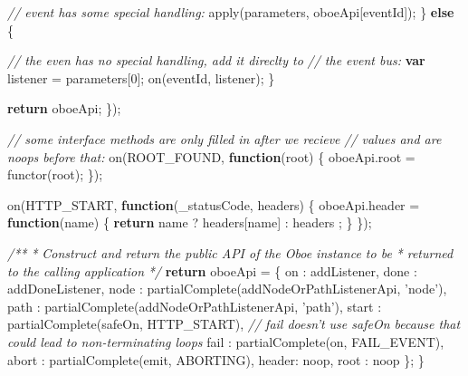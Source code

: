 \documentclass[12pt, ]{article}
\newenvironment{Shaded}{}{}
\newcommand{\KeywordTok}[1]{\textcolor[rgb]{0.00,0.44,0.13}{\textbf{{#1}}}}
\newcommand{\DataTypeTok}[1]{\textcolor[rgb]{0.56,0.13,0.00}{{#1}}}
\newcommand{\DecValTok}[1]{\textcolor[rgb]{0.25,0.63,0.44}{{#1}}}
\newcommand{\StringTok}[1]{\textcolor[rgb]{0.25,0.44,0.63}{{#1}}}
\newcommand{\CommentTok}[1]{\textcolor[rgb]{0.38,0.63,0.69}{\textit{{#1}}}}
\newcommand{\OtherTok}[1]{\textcolor[rgb]{0.00,0.44,0.13}{{#1}}}
\newcommand{\FunctionTok}[1]{\textcolor[rgb]{0.02,0.16,0.49}{{#1}}}
\newcommand{\NormalTok}[1]{{#1}}
\begin{document}
\begin{Shaded}
\begin{Highlighting}[]
         \CommentTok{// event has some special handling:}
         \FunctionTok{apply}\NormalTok{(parameters, oboeApi[eventId]);}
      \NormalTok{\} }\KeywordTok{else} \NormalTok{\{}
      
         \CommentTok{// the even has no special handling, add it direclty to}
         \CommentTok{// the event bus:         }
         \KeywordTok{var} \NormalTok{listener = parameters[}\DecValTok{0}\NormalTok{]; }
         \FunctionTok{on}\NormalTok{(eventId, listener);}
      \NormalTok{\}}
      
      \KeywordTok{return} \NormalTok{oboeApi;}
   \NormalTok{\});   }
   
   \CommentTok{// some interface methods are only filled in after we recieve}
   \CommentTok{// values and are noops before that:          }
   \FunctionTok{on}\NormalTok{(ROOT_FOUND, }\KeywordTok{function}\NormalTok{(root) \{}
      \OtherTok{oboeApi}\NormalTok{.}\FunctionTok{root} \NormalTok{= }\FunctionTok{functor}\NormalTok{(root);   }
   \NormalTok{\});}
   
   \FunctionTok{on}\NormalTok{(HTTP_START, }\KeywordTok{function}\NormalTok{(_statusCode, headers) \{}
      \OtherTok{oboeApi}\NormalTok{.}\FunctionTok{header} \NormalTok{= }
         \KeywordTok{function}\NormalTok{(name) \{}
            \KeywordTok{return} \NormalTok{name ? headers[name] }
                        \NormalTok{: headers}
                        \NormalTok{;}
         \NormalTok{\}}
   \NormalTok{\});}
      
   \CommentTok{/**}
\CommentTok{    * Construct and return the public API of the Oboe instance to be }
\CommentTok{    * returned to the calling application}
\CommentTok{    */}       
   \KeywordTok{return} \NormalTok{oboeApi = \{}
      \DataTypeTok{on    }\NormalTok{:  addListener,   }
      \DataTypeTok{done  }\NormalTok{:  addDoneListener,       }
      \DataTypeTok{node  }\NormalTok{:  }\FunctionTok{partialComplete}\NormalTok{(addNodeOrPathListenerApi, }\StringTok{'node'}\NormalTok{),}
      \DataTypeTok{path  }\NormalTok{:  }\FunctionTok{partialComplete}\NormalTok{(addNodeOrPathListenerApi, }\StringTok{'path'}\NormalTok{),      }
      \DataTypeTok{start }\NormalTok{:  }\FunctionTok{partialComplete}\NormalTok{(safeOn, HTTP_START),}
      \CommentTok{// fail doesn't use safeOn because that could lead to non-terminating loops}
      \DataTypeTok{fail  }\NormalTok{:  }\FunctionTok{partialComplete}\NormalTok{(on, FAIL_EVENT),}
      \DataTypeTok{abort }\NormalTok{:  }\FunctionTok{partialComplete}\NormalTok{(emit, ABORTING),}
      \DataTypeTok{header}\NormalTok{:  noop,}
      \DataTypeTok{root  }\NormalTok{:  noop}
   \NormalTok{\};   }
\NormalTok{\}   }
   
\end{Highlighting}
\end{Shaded}
\end{document}
